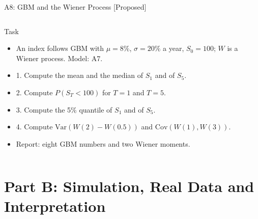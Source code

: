 \begin{frame}{A8: GBM and the Wiener Process [Proposed]}
\propsub
\itemsize{\scriptsize}
\begin{columns}[T]
\begin{column}{\taskw}
\begin{block}{Task}
\begin{itemize}
    \item An index follows GBM with $\mu = 8\%$, $\sigma = 20\%$ a year, $S_0 = 100$; $W$ is a Wiener process. Model: A7.
    \item 1. Compute the mean and the median of $S_1$ and of $S_5$.
    \item 2. Compute $P(S_T < 100)$ for $T = 1$ and $T = 5$.
    \item 3. Compute the 5\% quantile of $S_1$ and of $S_5$.
    \item 4. Compute $\text{Var}(W(2) - W(0.5))$ and $\text{Cov}(W(1), W(3))$.
    \item Report: eight GBM numbers and two Wiener moments.
\end{itemize}
\end{block}
\end{column}
\begin{column}{\solw}
\end{column}
\end{columns}
\end{frame}


\section{Part B: Simulation, Real Data and Interpretation}

